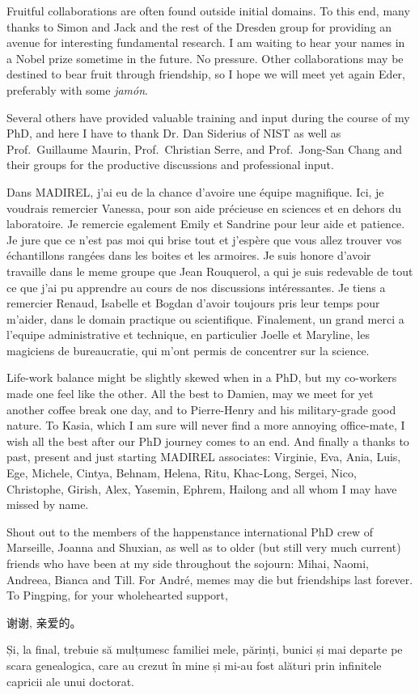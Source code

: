 Fruitful collaborations are often found outside initial domains. 
To this end, many thanks to Simon and Jack and the rest of the Dresden 
group for providing an avenue for interesting fundamental research.
I am waiting to hear your names in a Nobel prize sometime in the
future. No pressure. Other collaborations may be destined to bear fruit
through friendship, so I hope we will meet yet again Eder, preferably 
with some \textit{jamón}.

Several others have provided valuable training and input during the 
course of my PhD, and here I have to thank Dr. Dan Siderius of NIST
as well as Prof.\ Guillaume Maurin, Prof.\ Christian Serre, and 
Prof.\ Jong-San Chang and their groups
for the productive discussions and professional input.

Dans MADIREL, j'ai eu de la chance d'avoire une équipe magnifique.
Ici, je voudrais remercier Vanessa, pour son aide précieuse en sciences
et en dehors du laboratoire.
Je remercie egalement Emily et Sandrine pour leur aide et patience.
Je jure que ce n'est pas moi qui brise tout et j'espère que vous allez
trouver vos échantillons  rangées dans les boites 
et les armoires. Je suis honore d'avoir travaille dans le meme groupe 
que Jean Rouquerol, a qui je suis redevable de tout ce que j'ai pu apprendre
au cours de nos discussions intéressantes. Je tiens a remercier 
Renaud, Isabelle et Bogdan d'avoir toujours pris leur temps pour m'aider,
dans le domain practique ou scientifique. 
Finalement, un grand merci a l'equipe administrative et technique,
en particulier Joelle et Maryline, les magiciens de bureaucratie, qui 
m'ont permis de concentrer sur la science.

Life-work balance might be slightly skewed when in a PhD, but my
co-workers made one feel like the other.
All the best to Damien, may we meet for yet another coffee break 
one day, and to Pierre-Henry and his military-grade good nature.
To Kasia, which I am sure will never find a more annoying
office-mate, I wish all the best after our PhD journey comes to 
an end.
And finally a thanks to past, present and just starting MADIREL
associates: Virginie, Eva, Ania, Luis, Ege, Michele, Cintya, Behnam, Helena,
Ritu, Khac-Long, Sergei, Nico, Christophe, Girish, Alex, Yasemin, Ephrem, Hailong
and all whom I may have missed by name.

Shout out to the members of the happenstance international PhD crew of Marseille,
Joanna and Shuxian, as well as to older (but still very much current) friends
who have been at my side throughout the sojourn: Mihai, Naomi, Andreea, Bianca
and Till. For André, memes may die but friendships last forever.
To Pingping, for your wholehearted support,
\begin{CJK*}{UTF8}{gbsn}
    谢谢, 亲爱的。
\end{CJK*}

Și, la final, trebuie să mulțumesc familiei mele, părinți, bunici și 
mai departe pe scara genealogica, care au crezut în mine și mi-au fost alături
prin infinitele capricii ale unui doctorat.
